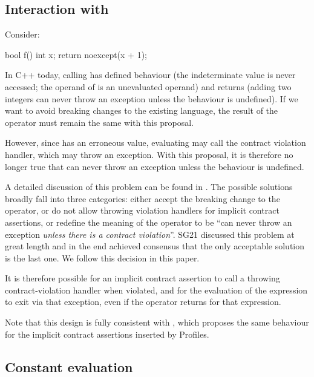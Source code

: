 
\subsection{Interaction with }

Consider:
\begin{codeblock}
bool f() {
  int x;
  return noexcept(x + 1);
}
\end{codeblock}
In C++ today, calling  has defined behaviour (the indeterminate value is never accessed; the operand of  is an unevaluated operand) and returns  (adding two integers can never throw an exception unless the behaviour is undefined). If we want to avoid breaking changes to the existing language, the result of the  operator must remain the same with this proposal.

However, since  has an erroneous value, evaluating  may call the contract violation handler, which may throw an exception. With this proposal, it is therefore no longer true that  can never throw an exception unless the behaviour is undefined.

A detailed discussion of this problem can be found in \cite{P3541R1}. The possible solutions broadly fall into three categories: either accept the breaking change to the  operator, or do not allow throwing violation handlers for implicit contract assertions, or redefine the  meaning of the  operator to be ``can never throw an exception \emph{unless there is a contract violation}''. SG21 discussed this problem at great length and in the end achieved consensus that the only acceptable solution is the last one. We follow this decision in this paper.

It is therefore possible for an implicit contract assertion to call a throwing contract-violation handler when violated, and for the evaluation of the expression to exit via that exception, even if the  operator returns  for that expression.

Note that this design is fully consistent with \cite{P3081R1}, which proposes the same behaviour for the implicit contract assertions inserted by Profiles.

\subsection{Constant evaluation}

